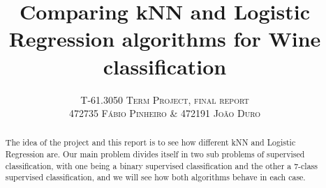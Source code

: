 \documentclass[twoside]{article}
\title{\vspace{-15mm}\fontsize{24pt}{10pt}\selectfont\textbf{Comparing kNN and Logistic Regression algorithms for Wine classification}}
\author{
\large
\textsc{T-61.3050 Term Project, final report}\\[2mm]
\textsc{472735 F\'{a}bio Pinheiro \& 472191 Jo\~{a}o Duro}\\[2mm]
\vspace{-5mm}
}
\date{}
\begin{document}
\maketitle %


\begin{abstract}
The idea of the project and this report is to see how different kNN and Logistic Regression are. Our main problem divides itself in two sub problems of supervised classification, with one being a binary supervised classification and the other a 7-class supervised classification, and we will see how both algorithms behave in each case.


\end{abstract}

\end{document}
